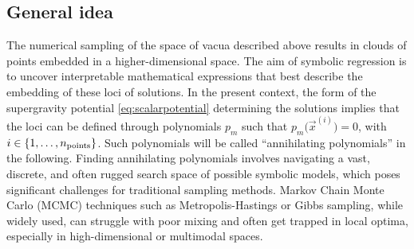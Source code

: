 \documentclass[11pt,a4paper]{article}
\begin{document}
	\subsection{General idea}
	The numerical sampling of the space of vacua described above results in clouds of points embedded in a higher-dimensional space. 
	The aim of symbolic regression is to uncover interpretable mathematical expressions that best describe the embedding of these loci of solutions. 
	In the present context, the form of the supergravity potential \eqref{eq:scalarpotential} determining the solutions implies that the loci can be defined through polynomials $p_{m}$ such that $p_{m}\big(\vec{x}^{(i)}\big) = 0$, with $i \in \{1, \dots, n_{\rm points}\}$. Such polynomials will be called ``annihilating polynomials'' in the following.
	Finding annihilating polynomials involves navigating a vast, discrete, and often rugged search space of possible symbolic models, which poses significant challenges for traditional sampling methods. 
	Markov Chain Monte Carlo (MCMC) techniques such as Metropolis-Hastings or Gibbs sampling, while widely used, can struggle with poor mixing and often get trapped in local optima, especially in high-dimensional or multimodal spaces.
\end{document}
